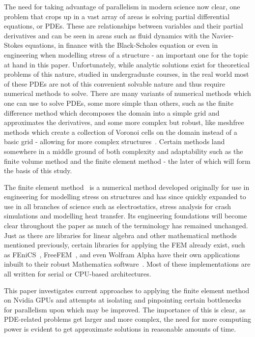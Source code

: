 The need for taking advantage of parallelism in modern science now clear, one problem that crops up in a vast array of areas is solving partial differential equations, or PDEs. These are relationships between variables and their partial derivatives and can be seen in areas such as fluid dynamics with the Navier-Stokes equations, in finance with the Black-Scholes equation or even in engineering when modelling stress of a structure - an important one for the topic at hand in this paper. Unfortunately, while analytic solutions exist for theoretical problems of this nature, studied in undergraduate courses, in the real world most of these PDEs are not of this convenient solvable nature and thus require numerical methods to solve. There are many variants of numerical methods which one can use to solve PDEs, some more simple than others, such as the finite difference method which decomposes the domain into a simple grid and approximates the derivatives, and some more complex but robust, like meshfree methods which create a collection of Voronoi cells on the domain instead of a basic grid - allowing for more complex structures~\cite{mfree}. Certain methods land somewhere in a middle ground of both complexity and adaptability such as the finite volume method and the finite element method - the later of which will form the basis of this study.

The finite element method~\cite{strang} is a numerical method developed originally for use in engineering for modelling stress on structures and has since quickly expanded to use in all branches of science such as electrostatics, stress analysis for crash simulations and modelling heat transfer. Its engineering foundations will become clear throughout the paper as much of the terminology has remained unchanged. Just as there are libraries for linear algebra and other mathematical methods mentioned previously, certain libraries for applying the FEM already exist, such as FEniCS~\cite{fenics}, FreeFEM~\cite{freefem}, and even Wolfram Alpha have their own applications inbuilt to their robust Mathematica software~\cite{walpha}. Most of these implementations are all written for serial or CPU-based architectures.

This paper investigates current approaches to applying the finite element method on Nvidia GPUs and attempts at isolating and pinpointing certain bottlenecks for parallelism upon which may be improved. The importance of this is clear, as PDE-related problems get larger and more complex, the  need for more computing power is evident to get approximate solutions in reasonable amounts of time.